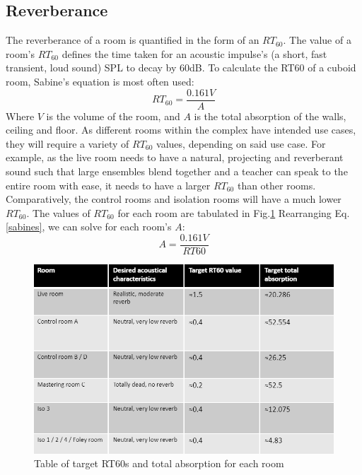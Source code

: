\documentclass[10pt, twocolumn]{article}
\begin{document}
        \subsection{Reverberance}
            The reverberance of a room is quantified in the form of an $RT_{60}$.
            The value of a room's $RT_{60}$ defines the time taken for an acoustic impulse's (a short, fast transient, loud sound) SPL to decay by 60dB.
            To calculate the RT60 of a cuboid room, Sabine's equation is most often used:
            \begin{equation}\label{sabines}
                RT_{60} = \frac{0.161 V}{A}
            \end{equation}
            Where $V$ is the volume of the room, and $A$ is the total absorption of the walls, ceiling and floor.
            As different rooms within the complex have intended use cases, they will require a variety of $RT_{60}$ values, depending on said use case.
            For example, as the live room needs to have a natural, projecting and reverberant sound such that large ensembles blend together and a teacher can speak to the entire room with ease, it needs to have a larger $RT_{60}$ than other rooms.
            Comparatively, the control rooms and isolation rooms will have a much lower $RT_{60}$.
            The values of $RT_{60}$ for each room are tabulated in Fig.\ref{RT60}
            Rearranging Eq.\ref{sabines}, we can solve for each room's $A$:
            \begin{equation}
                A = \frac{0.161V}{RT60} 
            \end{equation}
            \begin{figure}
                \centering
                \includegraphics[scale=0.48]{resources/RT60.png}
                \caption{Table of target RT60s and total absorption for each room}
                \label{RT60}
            \end{figure}
\end{document}
